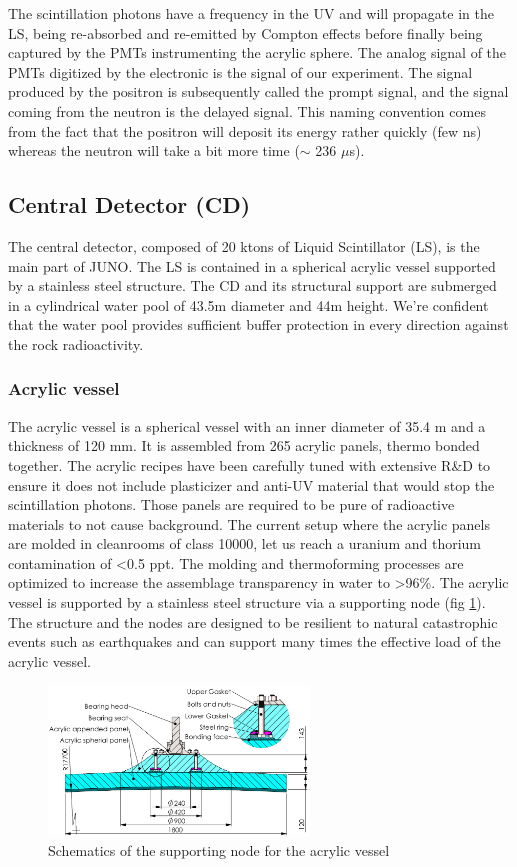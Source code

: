 \documentclass[../main.tex]{subfiles}
\begin{document}
The scintillation photons have a frequency in the UV and will propagate in the LS, being re-absorbed and re-emitted by Compton effects before finally being captured by the PMTs instrumenting the acrylic sphere. The analog signal of the PMTs digitized by the electronic is the signal of our experiment. The signal produced by the positron is subsequently called the prompt signal, and the signal coming from the neutron is the delayed signal. This naming convention comes from the fact that the positron will deposit its energy rather quickly (few ns) whereas the neutron will take a bit more time ($\sim$ 236 $\mu$s).

\subsection{Central Detector (CD)}
\label{sec:juno:CD}

The central detector, composed of 20 ktons of Liquid Scintillator (LS), is the main part of JUNO. The LS is contained in a spherical acrylic vessel supported by a stainless steel structure. The CD and its structural support are submerged in a cylindrical water pool of 43.5m diameter and 44m height. We're confident that the water pool provides sufficient buffer protection in every direction against the rock radioactivity.
\subsubsection{Acrylic vessel}
The acrylic vessel is a spherical vessel with an inner diameter of 35.4 m and a thickness of 120 mm. It is assembled from 265 acrylic panels, thermo bonded together. The acrylic recipes have been carefully tuned with extensive R\&D to ensure it does not include plasticizer and anti-UV material that would stop the scintillation photons.
Those panels are required to be pure of radioactive materials to not cause background. The current setup where the acrylic panels are molded in cleanrooms of class 10000, let us reach a uranium and thorium contamination of <0.5 ppt. The molding and thermoforming processes are optimized to increase the assemblage transparency in water to >96\%. The acrylic vessel is supported by a stainless steel structure via a supporting node (fig \ref{fig:juno:sup_node}). The structure and the nodes are designed to be resilient to natural catastrophic events such as earthquakes and can support many times the effective load of the acrylic vessel.

\begin{figure}[ht]
  \centering
  \includegraphics[height=4cm]{images/juno/node_b.png}
  \caption{Schematics of the supporting node for the acrylic vessel}
  \label{fig:juno:sup_node}
\end{figure}
\end{document}
